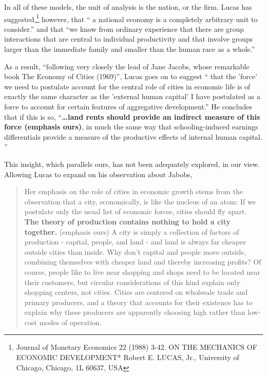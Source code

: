 In all of these models, the unit of analysis is the nation,  or the firm. Lucas has suggested,\footnote{Journal of Monetary Economics 22 (1988) 3-42.  ON THE MECHANICS OF ECONOMIC DEVELOPMENT*
Robert E. LUCAS, Jr., University of Chicago, Chicago, 1L 60637, USA}
however, that `` a national economy is a completely arbitrary unit to consider.'' and that ``we know from ordinary experience that there are group interactions that are central to individual productivity and that involve groups larger than the immediate family and smaller than the human race as a whole.''  


As a result, ``following very closely the lead of Jane Jacobs, whose remarkable book The Economy of Cities (1969)'', Lucas goes on to suggest `` that the 'force' we need to postulate account for the central role of cities in economic life is of exactly the same character as the 'external human capital' I have postulated as a force to account for certain features of aggregative development.''  He concludes that if this is so, ``\textbf{\dots land rents should provide an indirect measure of this force (emphasis  ours)}, in much the same way that schooling-induced earnings differentials provide a measure of the productive effects of internal human capital. ''

This insight, which parallels ours, has not been adequately explored, in our view.  Allowing Lucas to expand on his observation about Jabobs, 


\begin{quotation}
    Her emphasis on the role of cities in economic growth stems from the observation that a city, economically, is like the nucleus of an atom: If we postulate only the usual list of economic forces, cities should fly apart. \textbf{The theory of production contains nothing to hold a city together.} (emphasis ours) A city is simply a collection of factors of production - capital, people, and land - and land is always far cheaper outside cities than inside. Why don't capital and people move outside, combining themselves with cheaper land and thereby increasing profits? Of course, people like to live near shopping and shops need to be located near their customers, but circular considerations of this kind explain only shopping centers, not cities. Cities are centered on wholesale trade and primary producers, and a theory that accounts for their existence has to explain why these producers are apparently choosing high rather than low-cost modes of operation.
\end{quotation}

